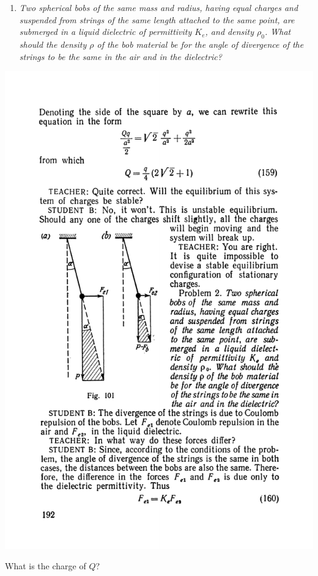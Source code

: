 \documentclass[a4paper,sfsidenotes]{tufte-book}
\begin{document}
\begin{enumerate}[label=Problem \arabic*.,font=\bfseries,resume=p3,leftmargin=*]
\item \emph{Two spherical bobs of the same mass and radius, having equal charges and suspended from strings of the same length attached to the same point, are submerged in a liquid dielectric of permittivity $K_{e}$, and density $\rho_{0}$. What should the density $\rho$ of the bob material be for the angle of divergence of the strings to be the same in the air and in the dielectric?}
\end{enumerate}
\begin{marginfigure}%
\centering
\includegraphics[width=\linewidth]{fig-101a}
\caption{What is the charge of $Q$?}
\label{fig-101}
\end{marginfigure}
\end{document}
